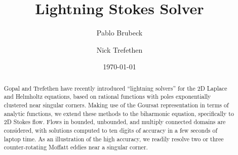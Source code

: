 \documentclass{article}
\begin{document}
\makeatletter
\title{Lightning Stokes Solver}
\author{Pablo Brubeck \and Nick Trefethen}
\date{\today}
\makeatother

\maketitle

\begin{abstract}
Gopal and Trefethen have recently introduced ``lightning solvers''
for the 2D Laplace and Helmholtz equations, based on rational
functions with poles exponentially clustered near singular corners.
Making use of the Goursat representation in terms of analytic
functions, we extend these methods to the biharmonic equation,
specifically to 2D Stokes flow.  Flows in bounded, unbounded, and
multiply connected domains are considered, with solutions computed
to ten digits of accuracy in a few seconds of laptop time.  As an
illustration of the high accuracy, we readily resolve two or three
counter-rotating Moffatt eddies near a singular corner.
\end{abstract}

\linespread{1}









\end{document}
